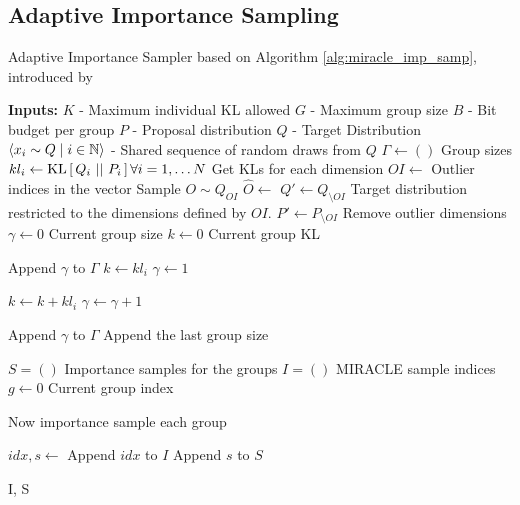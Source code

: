 \subsection{Adaptive Importance Sampling}
\begin{algorithm}
  \caption{Adaptive Importance Sampler based on Algorithm
    \ref{alg:miracle_imp_samp}, introduced by \cite{havasi2018minimal}}
  \label{alg:adaptive_importance_sampler}
  \begin{algorithmic}
    \State \textbf{Inputs:}
    \State $K$ - Maximum individual KL allowed
    \State $G$ - Maximum group size
    \State $B$ - Bit budget per group
    \State $P$ - Proposal distribution
    \State $Q$ - Target Distribution
    \State $\langle x_i \sim Q \mid i \in \mathbb{N} \rangle$ - Shared sequence of
    random draws from $Q$
    \Statex
    \State $\Gamma \gets ()$
    \Comment Group sizes
    \State $kl_i \gets \mathrm{KL}\left[\,Q_i\,\,||\,\,P_i\,\right] \forall i = 1, \hdots N$
    \Comment Get KLs for each dimension
    \State $OI \gets $ 
    \Comment Outlier indices in the vector
    \State Sample $O \sim Q_{OI}$
    \State $\hat{O} \gets $ 
    \State $Q' \gets Q_{\setminus OI}$
    \Comment Target distribution restricted to the dimensions defined by $OI$.
    \State $P' \gets P_{\setminus OI}$
    \Comment Remove outlier dimensions
    \State $\gamma \gets 0$
    \Comment Current group size
    \State $k \gets 0$
    \Comment Current group KL



    \State Append $\gamma$ to $\Gamma$
    \State $k \gets kl_i$
    \State $\gamma \gets 1$

    \Else

    \State $k \gets k + kl_i$
    \State $\gamma \gets \gamma + 1$

    \EndIf

    \EndFor

    \State Append $\gamma$ to $\Gamma$
    \Comment Append the last group size

    \State $S = ()$
    \Comment Importance samples for the groups
    \State $I = ()$
    \Comment MIRACLE sample indices
    \State $g \gets 0$
    \Comment Current group index

    \Comment Now importance sample each group

    \State $idx, s \gets$ 
    \State Append $idx$ to $I$
    \State Append $s$ to $S$

    \EndFor

    \State \Return I, S

    \EndProcedure
  \end{algorithmic}
\end{algorithm}
